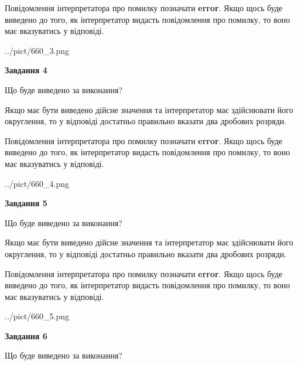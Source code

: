 \documentclass[12pt, ukrainian]{article}
\begin{document}
{\begin {Large}
Повідомлення інтерпретатора про помилку позначати \textbf{error}.
Якщо щось буде виведено до того, як інтерпретатор видасть повідомлення про помилку, 
то воно має вказуватись у відповіді. \par

\begin{center}
	{../pict/660_3.png}
\end{center}
\newpage

{\begin {center}\textbf{Завдання 4}\end {center}}\par
Що буде виведено за виконання? \par

Якщо має бути виведено дійсне значення та інтерпретатор має здійснювати його округлення, 
то у відповіді достатньо правильно вказати два дробових розряди.

Повідомлення інтерпретатора про помилку позначати \textbf{error}.
Якщо щось буде виведено до того, як інтерпретатор видасть повідомлення про помилку, 
то воно має вказуватись у відповіді. \par

\begin{center}
	{../pict/660_4.png}
\end{center}
\newpage

{\begin {center}\textbf{Завдання 5}\end {center}}\par
Що буде виведено за виконання? \par

Якщо має бути виведено дійсне значення та інтерпретатор має здійснювати його округлення, 
то у відповіді достатньо правильно вказати два дробових розряди.

Повідомлення інтерпретатора про помилку позначати \textbf{error}.
Якщо щось буде виведено до того, як інтерпретатор видасть повідомлення про помилку, 
то воно має вказуватись у відповіді. \par

\begin{center}
	{../pict/660_5.png}
\end{center}
\newpage

{\begin {center}\textbf{Завдання 6}\end {center}}\par
Що буде виведено за виконання? \par


\end{Large}}
\end{document}
